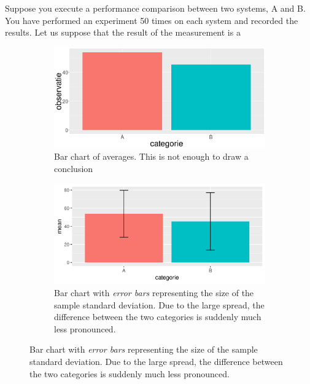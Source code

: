
Suppose you execute a performance comparison between two systems, A and B. You have performed an experiment 50 times on each system and recorded the results. Let us suppose that the result of the measurement is a

\begin{figure}
  \begin{subfigure}{.5\textwidth}
    \includegraphics[width=\textwidth]{examples/barplot.png}
    \caption{Bar chart of averages. This is not enough to draw a conclusion}
    \label{fig:barplot}
  \end{subfigure}
  \begin{subfigure}{.5\textwidth}
    \includegraphics[width=\textwidth]{examples/barplot-errorbars.png}
    \caption{Bar chart with \textit{error bars} representing the size of the sample standard deviation. Due to the large spread, the difference between the two categories is suddenly much less pronounced.}
    \label{fig:barplot-errorbars}
  \end{subfigure}
  

\end{figure}
